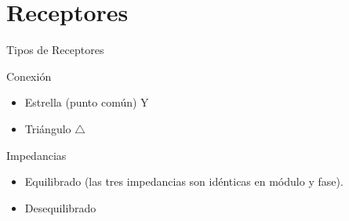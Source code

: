 \documentclass[aspectratio=169, usenames,svgnames,dvipsnames]{beamer}
\begin{document}
\section{Receptores}
\label{sec:orge273846}
\begin{frame}[label={sec:org919fda1}]{Tipos de Receptores}
\begin{block}{Conexión}
\begin{itemize}
\item \alert{Estrella} (punto común) Y
\item \alert{Triángulo} \(\triangle\)
\end{itemize}
\end{block}

\begin{block}{Impedancias}
\begin{itemize}
\item \alert{Equilibrado} (las tres impedancias son idénticas en módulo \alert{y} fase).
\item \alert{Desequilibrado}
\end{itemize}
\end{block}
\end{frame}
\end{document}
